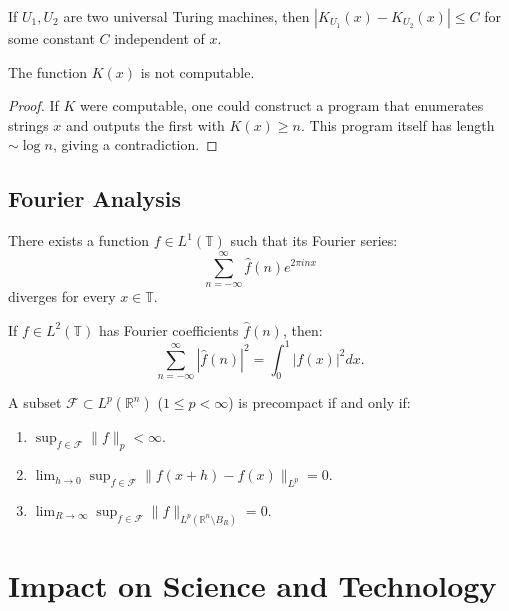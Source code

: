 \begin{theorem}[Invariance]
If $U_1, U_2$ are two universal Turing machines, then $|K_{U_1}(x) - K_{U_2}(x)| \leq C$ for some constant $C$ independent of $x$.
\end{theorem}

\begin{theorem}[Uncomputability]
The function $K(x)$ is not computable.
\end{theorem}

\begin{proof}
If $K$ were computable, one could construct a program that enumerates strings $x$ and outputs the first with $K(x) \geq n$. This program itself has length $\sim \log n$, giving a contradiction.
\end{proof}

\subsection{Fourier Analysis}

\begin{theorem}[Kolmogorov, 1923]
There exists a function $f \in L^1(\mathbb{T})$ such that its Fourier series:
\[
\sum_{n=-\infty}^\infty \hat{f}(n) e^{2\pi i n x}
\]
diverges for every $x \in \mathbb{T}$.
\end{theorem}

\begin{theorem}
If $f \in L^2(\mathbb{T})$ has Fourier coefficients $\hat{f}(n)$, then:
\[
\sum_{n=-\infty}^\infty |\hat{f}(n)|^2 = \int_0^1 |f(x)|^2 dx.
\]
\end{theorem}

\begin{theorem}
A subset $\mathcal{F} \subset L^p(\mathbb{R}^n)$ ($1 \leq p < \infty$) is precompact if and only if:
\begin{enumerate}
    \item $\sup_{f \in \mathcal{F}} \|f\|_p < \infty$.
    \item $\lim_{h \to 0} \sup_{f \in \mathcal{F}} \|f(x+h) - f(x)\|_{L^p} = 0$.
    \item $\lim_{R \to \infty} \sup_{f \in \mathcal{F}} \|f\|_{L^p(\mathbb{R}^n \setminus B_R)} = 0$.
\end{enumerate}
\end{theorem}

\section{Impact on Science and Technology}

